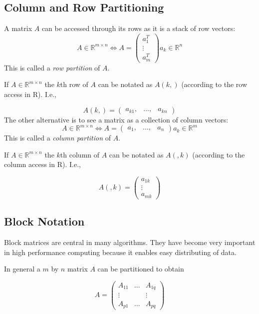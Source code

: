 \subsection{Column and Row Partitioning}

A matrix $A$ can be accessed through its rows as it is a stack of row
vectors:
$$ A \in \mathbb{R}^{m \times n} \Longleftrightarrow A = 
\left( \begin{array}{c}
a_{1}^T \\
\vdots \\
a_{m}^T 
\end{array} \right)
a_{k} \in \mathbb{R}^n 
$$
This is called a \textit{row partition} of $A$.


If $A \in \mathbb{R}^{m \times n}$ the $k$th row of $A$ can be notated
as $A(k,)$ (according to the row access in R). I.e.,

$$ A(k,) = \left( \begin{array}{ccc}
a_{k1}, & \ldots, & a_{kn}
\end{array} \right)
$$
The other alternative is to see a matrix as a collection of column
vectors:
$$ A \in \mathbb{R}^{m \times n} \Longleftrightarrow A = 
\left( \begin{array}{ccc}
a_{1}, & \ldots, & a_{n}
\end{array} \right)
a_{k} \in \mathbb{R}^m 
 $$
This is called a \textit{column partition} of $A$.

If $A \in \mathbb{R}^{m \times n}$ the $k$th column of $A$ can be notated
as $A(,k)$ (according to the column access in R). I.e.,

$$ A(,k) = \left( \begin{array}{c}
a_{1k} \\
\vdots \\
a_{mk} 
\end{array} \right)
 $$

\subsection{Block Notation}
\label{sec:blocknot}
Block matrices are central in many algorithms. They have become very
important in high performance computing because it enables
easy distributing of data. 

In general a $m$ by $n$ matrix $A$ can be partitioned to obtain

$$ 
A = \left( \begin{array}{ccc}
A_{11} & \ldots & A_{1q} \\
\vdots &        & \vdots \\
A_{p1} & \ldots & A_{pq}
\end{array} \right)
$$

